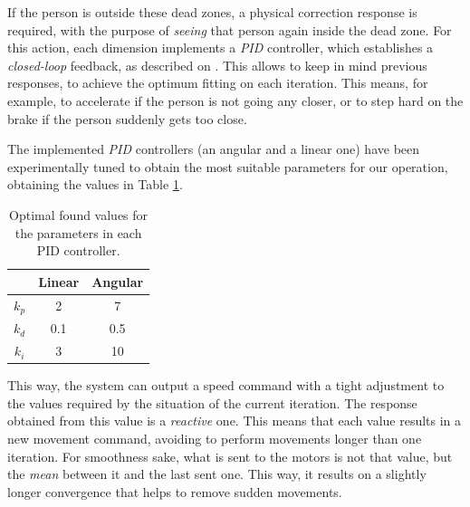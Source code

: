 If the person is outside these dead zones, a physical correction response is required, with the purpose of \emph{seeing} that person again inside the dead zone. For this action, each dimension implements a \emph{PID} controller, which establishes a \emph{closed-loop} feedback, as described on \cite{pid-controller}. This allows to keep in mind previous responses, to achieve the optimum fitting on each iteration. This means, for example, to accelerate if the person is not going any closer, or to step hard on the brake if the person suddenly gets too close.

The implemented \emph{PID} controllers (an angular and a linear one) have been experimentally tuned to obtain the most suitable parameters for our operation, obtaining the values in Table \ref{tab:pids}.

\begin{table}[h]
	\centering
	\begin{tabular}{|c|c|c|}
		\hline
		\textbf{} & \textbf{Linear} & \textbf{Angular} \\ \hline
		$k_p$     & 2               & 7                \\ \hline
		$k_d$     & 0.1             & 0.5              \\ \hline
		$k_i$     & 3               & 10               \\ \hline
	\end{tabular}
	\caption{Optimal found values for the parameters in each PID controller.}
	\label{tab:pids}
\end{table}

This way, the system can output a speed command with a tight adjustment to the values required by the situation of the current iteration. The response obtained from this value is a \emph{reactive} one. This means that each value results in a new movement command, avoiding to perform movements longer than one iteration. For smoothness sake, what is sent to the motors is not that value, but the \emph{mean} between it and the last sent one. This way, it results on a slightly longer convergence that helps to remove sudden movements.


